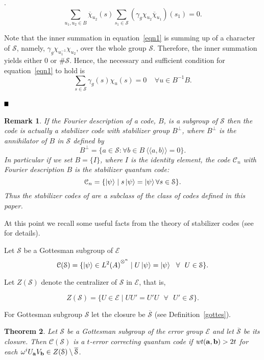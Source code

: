 \documentclass{Rinton-P9x6}
\newtheorem{theorem}{Theorem}[section]
\newtheorem{remark}[theorem]{Remark}
\newcommand {\ket} [1] {\ensuremath \left\vert#1\ensuremath \right\rangle}
\newcommand{\bproof}{\noindent{\it Proof}}
\newcommand{\eproof}{\hspace*{\fill}$\rule{2mm}{2mm}$~~~~~\bigskip}
\renewenvironment{proof}{\bproof. }{\eproof}
\renewcommand{\a}{{\bf a}}
\renewcommand{\b}{{\bf b}}
\newcommand{\om}{{\omega}}
\newcommand{\wt}{{\it wt}}
\newcommand{\C}{{\ensuremath{\mathcal{C}}}}
\renewcommand{\S}{{\ensuremath{\mathcal{S}}}}
\newcommand{\cS}{{\ensuremath{\overline{\mathcal{S}}}}}
\newcommand{\HinA}{{\ensuremath{{L^2(A)}^{\otimes^n}}}}
\newcommand{\E}{{\ensuremath{\mathcal{E}}}}
\newcommand{\biangle}[1]{\langle\langle #1\rangle\rangle}
\begin{document}
\begin{proof}
\begin{equation}\label{eqn1}
\sum_{u_1,u_2 \in B} \overline{\chi}_{u_2}(s) \sum_{s_1 \in \S}
(\gamma_g\chi_{u_2} \overline{\chi}_{u_1})(s_1) = 0.
\end{equation}
 
Note that the inner summation in equation~\ref{eqn1} is summing up of
a character of $\S$, namely, $\gamma_g \chi_{u_1^{-1}} \chi_{u_2}$,
over the whole group $\S$. Therefore, the inner summation yields
either $0$ or $\# \S$. Hence, the necessary and sufficient condition
for equation~\ref{eqn1} to hold is
\[
\sum_{s \in \S}\gamma_g(s)\chi_u(s) = 0~~~~~\forall u \in B^{-1}B.
\]

\end{proof}

\begin{remark}
  If the Fourier description of a code, $B$, is a subgroup of $\S$
  then the code is actually a stabilizer code with stabilizer group
  $B^\perp$, where $B^\perp$ is the annihilator of $B$ in $\S$ defined
  by
  \[
  B^\perp = \{ a \in \S : \forall b \in B\ \biangle{a,b} = 0 \}.
  \]
  In particular if we set $B=\{I\}$, where $I$ is the identity
  element, the code $\C_n$ with Fourier description $B$ is the
  stabilizer quantum code:
  \[
  \C_n = \{\ket{\psi}\mid s\ket{\psi}=\ket{\psi} \forall s\in\S\}.
  \]
  Thus the stabilizer codes of\cite{gottes} are a subclass of the class
  of codes defined in this paper.
\end{remark}

At this point we recall some useful facts from the theory of
stabilizer codes (see\cite{AP02} for details).

Let $\S$ be a Gottesman subgroup of $\E$
\[
\C(\S)=\{\ket{\psi}\in\HinA\mid U\ket{\psi}=\ket{\psi}\mbox{~~}\forall\mbox{~~} U\in \S\}.
\]

Let $Z(\S)$ denote the centralizer of $\S$ in $\E$, that is,

\[
Z(\S) = \{U\in\E\mid UU'=U'U \mbox{~~}\forall\mbox{~~} U'\in \S\}.
\]

For Gottesman subgroup $\S$ let the closure be $\overline{\S}$ (see
Definition~\ref{gottes}).

\begin{theorem}\label{kl-3}
  Let $\S$ be a Gottesman subgroup of the error group $\E$ and let
  $\cS$ be its closure. Then $\C(\S)$ is a $t$-error correcting
  quantum code if $\wt(\a,\b)>2t$ for each $\om^iU_{\a}V_{\b}\in
  Z(\S)\setminus\cS$.
\end{theorem}
\end{document}
